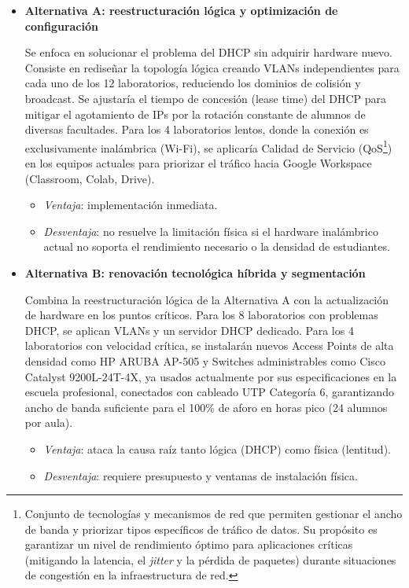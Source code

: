 	\begin{itemize}
		\item \textbf{Alternativa A: reestructuración lógica y optimización de configuración}

		Se enfoca en solucionar el problema del DHCP sin adquirir hardware nuevo. Consiste en rediseñar la topología lógica creando VLANs independientes para cada uno de los 12 laboratorios, reduciendo los dominios de colisión y broadcast. Se ajustaría el tiempo de concesión (lease time) del DHCP para mitigar el agotamiento de IPs por la rotación constante de alumnos de diversas facultades. Para los 4 laboratorios lentos, donde la conexión es exclusivamente inalámbrica (Wi-Fi), se aplicaría Calidad de Servicio (QoS\footnote{Conjunto de tecnologías y mecanismos de red que permiten gestionar el ancho de banda y priorizar tipos específicos de tráfico de datos. Su propósito es garantizar un nivel de rendimiento óptimo para aplicaciones críticas (mitigando la latencia, el \textit{jitter} y la pérdida de paquetes) durante situaciones de congestión en la infraestructura de red.}) en los equipos actuales para priorizar el tráfico hacia Google Workspace (Classroom, Colab, Drive).

		\begin{itemize}
			\item \textit{Ventaja}: implementación inmediata.
			\item \textit{Desventaja}: no resuelve la limitación física si el hardware inalámbrico actual no soporta el rendimiento necesario o la densidad de estudiantes.
		\end{itemize}

		\item \textbf{Alternativa B: renovación tecnológica híbrida y segmentación}

		Combina la reestructuración lógica de la Alternativa A con la actualización de hardware en los puntos críticos. Para los 8 laboratorios con problemas DHCP, se aplican VLANs y un servidor DHCP dedicado. Para los 4 laboratorios con velocidad crítica, se instalarán nuevos Access Points de alta densidad como HP ARUBA AP-505 y Switches administrables como Cisco Catalyst 9200L-24T-4X, ya usados actualmente por sus especificaciones en la escuela profesional, conectados con cableado UTP Categoría 6, garantizando ancho de banda suficiente para el 100\% de aforo en horas pico (24 alumnos por aula).

		\begin{itemize}
			\item \textit{Ventaja}: ataca la causa raíz tanto lógica (DHCP) como física (lentitud).
			\item \textit{Desventaja}: requiere presupuesto y ventanas de instalación física.
		\end{itemize}
	\end{itemize}

